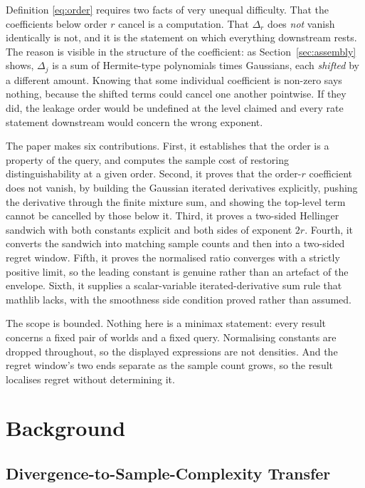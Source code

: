 Definition \eqref{eq:order} requires two facts of very unequal difficulty. That the
coefficients below order $r$ cancel is a computation. That $\Delta_{r}$ does \emph{not}
vanish identically is not, and it is the statement on which everything downstream rests. The
reason is visible in the structure of the coefficient: as
Section~\ref{sec:assembly} shows, $\Delta_{j}$ is a sum of Hermite-type polynomials times
Gaussians, each \emph{shifted} by a different amount. Knowing that some individual
coefficient is non-zero says nothing, because the shifted terms could cancel one another
pointwise. If they did, the leakage order would be undefined at the level claimed and every
rate statement downstream would concern the wrong exponent.

The paper makes six contributions. First, it establishes that the order is a property of the
query, and computes the sample cost of restoring distinguishability at a given order. Second,
it proves that the order-$r$ coefficient does not vanish, by building the Gaussian iterated
derivatives explicitly, pushing the derivative through the finite mixture sum, and showing
the top-level term cannot be cancelled by those below it. Third, it proves a two-sided
Hellinger sandwich with both constants explicit and both sides of exponent $2r$. Fourth, it
converts the sandwich into matching sample counts and then into a two-sided regret window.
Fifth, it proves the normalised ratio converges with a strictly positive limit, so the
leading constant is genuine rather than an artefact of the envelope. Sixth, it supplies a
scalar-variable iterated-derivative sum rule that mathlib lacks, with the smoothness side
condition proved rather than assumed.

The scope is bounded. Nothing here is a minimax statement: every result concerns a fixed
pair of worlds and a fixed query. Normalising constants are dropped throughout, so the
displayed expressions are not densities. And the regret window's two ends separate as the
sample count grows, so the result localises regret without determining it.

\section{Background}

\subsection{Divergence-to-Sample-Complexity Transfer}

